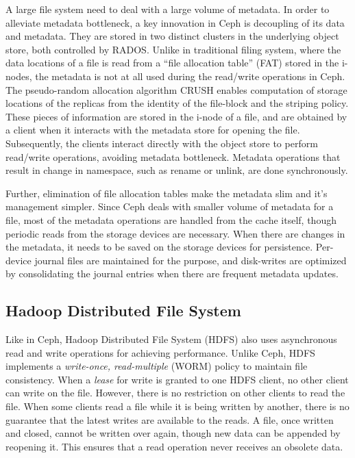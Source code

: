 A large file system need to deal with a large volume of metadata. In order to alleviate metadata bottleneck, a key innovation in Ceph 
is decoupling of its data and metadata. They are stored in two distinct clusters in the underlying object store, both controlled by
RADOS. 
%
Unlike in traditional filing system, where the data locations of a file is read from a ``file allocation table'' (FAT) stored
in the i-nodes, the metadata is not at all used during the read/write operations in Ceph. The pseudo-random allocation algorithm 
CRUSH enables computation of storage locations of the replicas from the identity of the file-block and the striping policy. 
These pieces of information are stored in the i-node of a file, and are obtained by a client when it interacts with the metadata 
store for opening the file. Subsequently, the clients interact directly with the object store to perform read/write operations,
avoiding metadata bottleneck. Metadata operations that result in change in namespace, such as rename or unlink, are done synchronously.
 
Further, elimination of file allocation tables make the metadata slim and it's management simpler. Since Ceph deals with smaller volume 
of metadata for a file, most of the metadata operations are handled from the cache itself, though periodic reads from the storage devices
are necessary. When there are changes in the metadata, it needs to be saved on the storage devices for persistence. Per-device journal 
files are maintained for the purpose, and disk-writes are optimized by consolidating the journal entries when there are frequent metadata 
updates.

\subsection{Hadoop Distributed File System}
\label{sec:bigdata:hdfs}

 
Like in Ceph, Hadoop Distributed File System (HDFS) also uses asynchronous read and write operations for achieving performance.
Unlike Ceph, HDFS implements a {\em write-once, read-multiple} (WORM) policy to maintain file consistency. When a {\em lease} for
write is granted to one HDFS client, no other client can write on the file. However, there is no restriction on other clients to read 
the file. When some clients read a file while it is being written by another, there is no guarantee that the latest writes are 
available to the reads. A file, once written and closed, cannot be written over again, though new data can be appended by reopening
it. This ensures that a read operation never receives an obsolete data.

